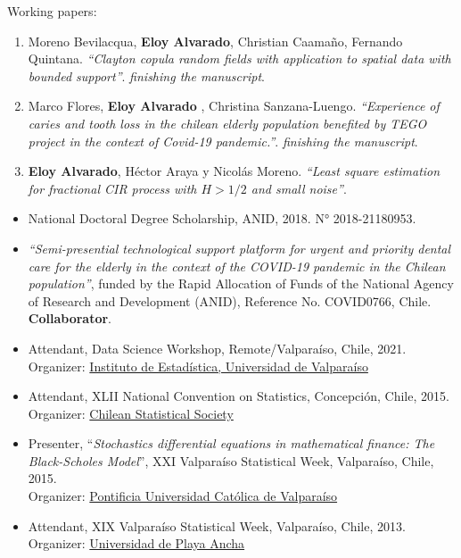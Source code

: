 \documentclass[10pt,a4paper]{article}
\begin{document}
\inlineheadsection 
{Working papers:}{}
\begin{enumerate}
\item Moreno Bevilacqua, \textbf{Eloy Alvarado}, Christian Caamaño, Fernando Quintana. \textit{``Clayton copula random fields with application to spatial data with bounded support''}. \textit{finishing the manuscript}.
\item Marco Flores, \textbf{Eloy Alvarado} , Christina Sanzana-Luengo. \textit{``Experience of caries and tooth loss in the chilean elderly population benefited by TEGO project in the context of Covid-19 pandemic.''}. \textit{finishing the manuscript}.
\item \textbf{Eloy Alvarado}, Héctor Araya y Nicolás Moreno. \textit{``Least square estimation for fractional CIR process with $H>1/2$ and small noise''}.
\end{enumerate}

\begin{itemize}
\item National Doctoral Degree Scholarship, ANID, 2018. N° 2018-21180953.
\item \textit{``Semi-presential technological support platform for urgent and
priority dental care for the elderly in the context of the COVID-19 pandemic in the Chilean population''}, funded by the Rapid Allocation of Funds of the National Agency of Research and
Development (ANID), Reference No. COVID0766, Chile. \textbf{Collaborator}.
\end{itemize}




\begin{itemize}
\item Attendant, Data Science Workshop, Remote/Valparaíso, Chile, 2021.\\
Organizer: \href{https://ideuv.uv.cl/}{Instituto de Estadística, Universidad de Valparaíso}

\item Attendant, XLII National Convention on Statistics, Concepción, Chile, 2015. \\
Organizer:  \href{http://www.soche.cl}{ Chilean Statistical
Society}
\item Presenter, ``\textit{Stochastics differential equations in mathematical finance: The Black-Scholes Model}'', XXI Valparaíso Statistical Week, Valparaíso, Chile, 2015. \\ Organizer: \href{http://www.pucv.cl}{Pontificia Universidad Católica de Valparaíso}

\item Attendant, XIX Valparaíso Statistical Week, Valparaíso, Chile, 2013. \\ Organizer:  \href{http://www.upla.cl}{Universidad de Playa Ancha}


\end{itemize}
\end{document}
